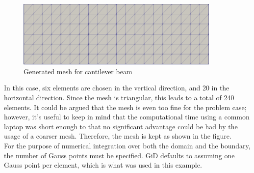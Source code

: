 \begin{figure}[ht]
\centering
  \includegraphics[width=100mm]{images/mesh.png}
  \caption{Generated mesh for cantilever beam}
  \label{cantileverBeam:mesh}
\end{figure}
In this case, six elements are chosen in the vertical direction, and 20 in the horizontal direction. Since the mesh is triangular, this leads to a total of 240 elements. It could be argued that the mesh is even too fine for the problem case; however, it's useful to keep in mind that the computational time using a common laptop was short enough to that no significant advantage could be had by the usage of a coarser mesh. Therefore, the mesh is kept as shown in the figure.\\[6pt]
For the purpose of numerical integration over both the domain and the boundary, the number of Gauss points must be specified. GiD defaults to assuming one Gauss point per element, which is what was used in this example.\\[6pt]



